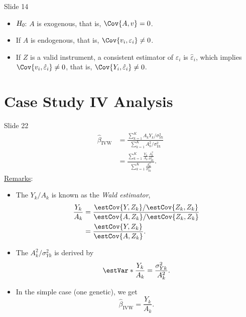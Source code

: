 \begin{Regular}{Slide 14}
    \begin{itemize}
        \item $ \textsl{H}_{\textsl{0}} $: $ A $ is exogenous, that is, $ \Cov{A,v}=0 $.
        \item If $ A $ is endogenous, that is, $ \Cov{v_i,\varepsilon_i}\ne 0 $.
        \item If $ Z $ is a valid instrument, a consistent estimator of $ \varepsilon_i $ is $ \hat{\varepsilon}_i $, which
              implies $ \Cov{v_i,\hat{\varepsilon}_i}\ne 0 $, that is, $ \Cov{Y_i,\hat{\varepsilon}_i}\ne 0 $.
    \end{itemize}
\end{Regular}
\section*{Case Study IV Analysis}
\begin{Regular}{Slide 22}
    \begin{align*}
        \hat{\beta}_{\text{IVW}}
         & =\frac{\sum_{k=1}^{K}A_k Y_k/\sigma_{Yk}^2}{\sum_{k=1}^{K}A_k^2/\sigma_{Yk}^2}                                                           \\
         & =\frac{\displaystyle \sum_{k=1}^{K}\frac{Y_k}{A_k}\frac{A_k^2}{\sigma_{Yk}^2}}{\displaystyle \sum_{k=1}^{K}\frac{A_k^2}{\sigma_{Yk}^2}}.
    \end{align*}
    \tcblower{}
    \underline{Remarks}:
    \begin{itemize}
        \item The $ Y_k/A_k $ is known as the \emph{Wald estimator},
              \begin{align*}
                  \frac{Y_k}{A_k}
                   & =\frac{\estCov{Y,Z_k}/\estCov{Z_k,Z_k}}{\estCov{A,Z_k}/\estCov{Z_k,Z_k}} \\
                   & =\frac{\estCov{Y,Z_k}}{\estCov{A,Z_k}}.
              \end{align*}
        \item The $ A_k^2/\sigma_{Yk}^2 $ is derived by
              \[ \estVar*{\frac{Y_k}{A_k}}=\frac{\sigma_{Yk}^2}{A_k^2}. \]
        \item In the simple case (one genetic), we get
              \[ \hat{\beta}_{\text{IVW}}=\frac{Y_k}{A_k}. \]
    \end{itemize}
\end{Regular}